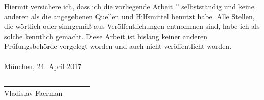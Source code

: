 
 
Hiermit versichere ich, dass ich die vorliegende Arbeit '\themaT' selbstständig und keine anderen als die angegebenen Quellen und Hilfsmittel benutzt habe. Alle Stellen, die wörtlich oder sinngemäß aus Veröffentlichungen entnommen sind, habe ich als solche kenntlich gemacht. Diese Arbeit ist bislang keiner anderen Prüfungsbehörde vorgelegt worden und auch nicht veröffentlicht worden.
\\\\München, 24. April 2017

\vskip 1.5cm

\underline{~~~~~~~~~~~~~~~~~~~~~~~~}\\
Vladislav Faerman\\
